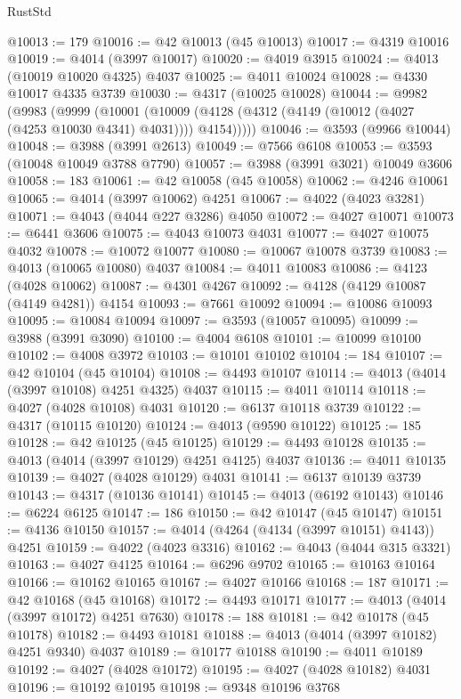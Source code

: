\begin{lexlean}{RustStd}
\begin{coremodule}
@10013 := 179
@10016 := @42 @10013 (@45 @10013)
@10017 := @4319 @10016
@10019 := @4014 (@3997 @10017)
@10020 := @4019 @3915
@10024 := @4013 (@10019 @10020 @4325) @4037
@10025 := @4011 @10024
@10028 := @4330 @10017 @4335 @3739
@10030 := @4317 (@10025 @10028)
@10044 := @9982
    (@9983
      (@9999
        (@10001
          (@10009 (@4128 (@4312 (@4149 (@10012 (@4027 (@4253 @10030 @4341) @4031)))) @4154)))))
@10046 := @3593 (@9966 @10044)
@10048 := @3988 (@3991 @2613)
@10049 := @7566 @6108
@10053 := @3593 (@10048 @10049 @3788 @7790)
@10057 := @3988 (@3991 @3021) @10049 @3606
@10058 := 183
@10061 := @42 @10058 (@45 @10058)
@10062 := @4246 @10061
@10065 := @4014 (@3997 @10062) @4251
@10067 := @4022 (@4023 @3281)
@10071 := @4043 (@4044 @227 @3286) @4050
@10072 := @4027 @10071
@10073 := @6441 @3606
@10075 := @4043 @10073 @4031
@10077 := @4027 @10075 @4032
@10078 := @10072 @10077
@10080 := @10067 @10078 @3739
@10083 := @4013 (@10065 @10080) @4037
@10084 := @4011 @10083
@10086 := @4123 (@4028 @10062)
@10087 := @4301 @4267
@10092 := @4128 (@4129 @10087 (@4149 @4281)) @4154
@10093 := @7661 @10092
@10094 := @10086 @10093
@10095 := @10084 @10094
@10097 := @3593 (@10057 @10095)
@10099 := @3988 (@3991 @3090)
@10100 := @4004 @6108
@10101 := @10099 @10100
@10102 := @4008 @3972
@10103 := @10101 @10102
@10104 := 184
@10107 := @42 @10104 (@45 @10104)
@10108 := @4493 @10107
@10114 := @4013 (@4014 (@3997 @10108) @4251 @4325) @4037
@10115 := @4011 @10114
@10118 := @4027 (@4028 @10108) @4031
@10120 := @6137 @10118 @3739
@10122 := @4317 (@10115 @10120)
@10124 := @4013 (@9590 @10122)
@10125 := 185
@10128 := @42 @10125 (@45 @10125)
@10129 := @4493 @10128
@10135 := @4013 (@4014 (@3997 @10129) @4251 @4125) @4037
@10136 := @4011 @10135
@10139 := @4027 (@4028 @10129) @4031
@10141 := @6137 @10139 @3739
@10143 := @4317 (@10136 @10141)
@10145 := @4013 (@6192 @10143)
@10146 := @6224 @6125
@10147 := 186
@10150 := @42 @10147 (@45 @10147)
@10151 := @4136 @10150
@10157 := @4014 (@4264 (@4134 (@3997 @10151) @4143)) @4251
@10159 := @4022 (@4023 @3316)
@10162 := @4043 (@4044 @315 @3321)
@10163 := @4027 @4125
@10164 := @6296 @9702
@10165 := @10163 @10164
@10166 := @10162 @10165
@10167 := @4027 @10166
@10168 := 187
@10171 := @42 @10168 (@45 @10168)
@10172 := @4493 @10171
@10177 := @4013 (@4014 (@3997 @10172) @4251 @7630)
@10178 := 188
@10181 := @42 @10178 (@45 @10178)
@10182 := @4493 @10181
@10188 := @4013 (@4014 (@3997 @10182) @4251 @9340) @4037
@10189 := @10177 @10188
@10190 := @4011 @10189
@10192 := @4027 (@4028 @10172)
@10195 := @4027 (@4028 @10182) @4031
@10196 := @10192 @10195
@10198 := @9348 @10196 @3768

\end{coremodule}
\end{lexlean}
